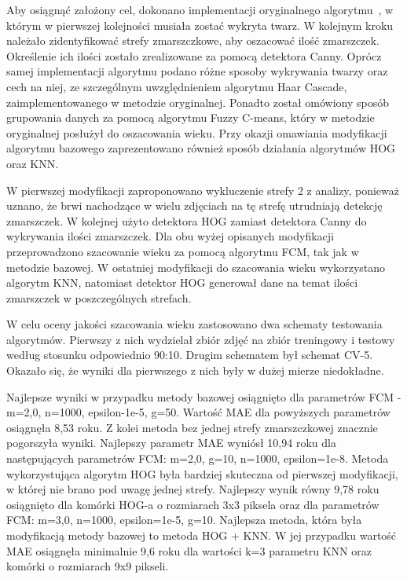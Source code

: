 \documentclass[a4paper,twoside,12pt]{book}
\begin{document}
    Aby osiągnąć założony cel, dokonano implementacji oryginalnego algorytmu~\cite{wrinkleFeatures},
    w którym w pierwszej kolejności musiała zostać wykryta twarz.
    W kolejnym kroku należało zidentyfikować strefy zmarszczkowe, aby oszacować ilość zmarszczek.
    Określenie ich ilości zostało zrealizowane za pomocą detektora Canny. Oprócz samej implementacji
    algorytmu podano różne sposoby wykrywania twarzy oraz cech na niej, ze szczególnym uwzględnieniem
    algorytmu Haar Cascade, zaimplementowanego w metodzie oryginalnej. Ponadto został omówiony sposób
    grupowania danych za pomocą algorytmu Fuzzy C-means, który w metodzie oryginalnej posłużył do oszacowania
    wieku. Przy okazji omawiania modyfikacji algorytmu bazowego zaprezentowano również sposób działania
    algorytmów HOG oraz KNN.

    W pierwszej modyfikacji zaproponowano wykluczenie strefy 2 z analizy, ponieważ uznano,
    że brwi nachodzące w wielu zdjęciach na tę strefę utrudniają detekcję zmarszczek.
    W kolejnej użyto detektora HOG zamiast detektora Canny do wykrywania ilości zmarszczek.
    Dla obu wyżej opisanych modyfikacji przeprowadzono szacowanie wieku za pomocą algorytmu FCM,
    tak jak w metodzie bazowej. W ostatniej modyfikacji do szacowania wieku wykorzystano algorytm KNN,
    natomiast detektor HOG generował dane na temat ilości zmarszczek w poszczególnych strefach.

    W celu oceny jakości szacowania wieku zastosowano dwa schematy testowania algorytmów.
    Pierwszy z nich wydzielał zbiór zdjęć na zbiór treningowy i testowy według stosunku odpowiednio 90:10.
    Drugim schematem był schemat CV-5. Okazało się, że wyniki dla pierwszego z nich były w dużej mierze
    niedokładne.

    Najlepsze wyniki w przypadku metody bazowej osiągnięto dla parametrów FCM - m=2,0, n=1000,
    epsilon-1e-5, g=50. Wartość MAE dla powyższych parametrów osiągnęła 8,53 roku.
    Z kolei metoda bez jednej strefy zmarszczkowej znacznie pogorszyła wyniki.
    Najlepszy parametr MAE wyniósł 10,94 roku dla następujących parametrów FCM: m=2,0, g=10, n=1000,
    epsilon=1e-8. Metoda wykorzystująca algorytm HOG była bardziej skuteczna od pierwszej modyfikacji,
    w której nie brano pod uwagę jednej strefy. Najlepszy wynik równy 9,78 roku osiągnięto dla komórki
    HOG-a o rozmiarach 3x3 piksela oraz dla parametrów FCM: m=3,0, n=1000, epsilon=1e-5, g=10.
    Najlepsza metoda, która była modyfikacją metody bazowej to metoda HOG + KNN. W jej przypadku
    wartość MAE osiągnęła minimalnie 9,6 roku dla wartości k=3 parametru KNN oraz komórki o rozmiarach 9x9 pikseli.
\end{document}
